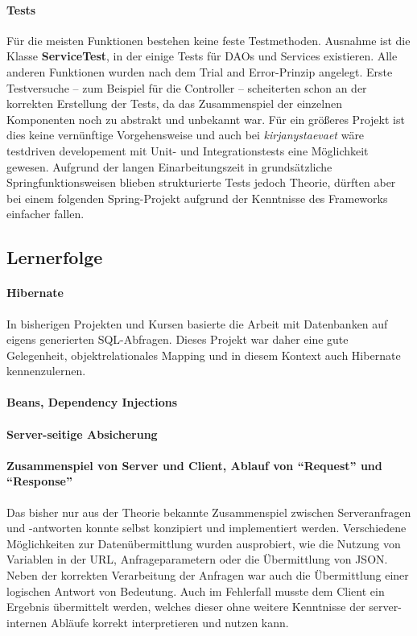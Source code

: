 		\paragraph{Tests} Für die meisten Funktionen bestehen keine feste Testmethoden. Ausnahme ist die Klasse \textbf{ServiceTest}, in der einige Tests für DAOs und Services existieren. Alle anderen Funktionen wurden nach dem Trial and Error-Prinzip angelegt. Erste Testversuche -- zum Beispiel für die Controller -- scheiterten schon an der korrekten Erstellung der Tests, da das Zusammenspiel der einzelnen Komponenten noch zu abstrakt und unbekannt war. Für ein größeres Projekt ist dies keine vernünftige Vorgehensweise und auch bei \textit{kirjanystaevaet} wäre testdriven developement mit Unit- und Integrationstests eine Möglichkeit gewesen. Aufgrund der langen Einarbeitungszeit in grundsätzliche Springfunktionsweisen blieben strukturierte Tests jedoch Theorie, dürften aber bei einem folgenden Spring-Projekt aufgrund der Kenntnisse des Frameworks einfacher fallen.

	\subsection{Lernerfolge}
		\paragraph{Hibernate} In bisherigen Projekten und Kursen basierte die Arbeit mit Datenbanken auf eigens generierten SQL-Abfragen. Dieses Projekt war daher eine gute Gelegenheit, objektrelationales Mapping und in diesem Kontext auch Hibernate kennenzulernen.
		
		\paragraph{Beans, Dependency Injections}
		
		\paragraph{Server-seitige Absicherung}
		
		\paragraph{Zusammenspiel von Server und Client, Ablauf von "`Request"' und "`Response"'}
		Das bisher nur aus der Theorie bekannte Zusammenspiel zwischen Serveranfragen und -antworten konnte selbst konzipiert und implementiert werden. Verschiedene Möglichkeiten zur Datenübermittlung wurden ausprobiert, wie die Nutzung von Variablen in der URL, Anfrageparametern oder die Übermittlung von JSON. Neben der korrekten Verarbeitung der Anfragen war auch die Übermittlung einer logischen Antwort von Bedeutung. Auch im Fehlerfall musste dem Client ein Ergebnis übermittelt werden, welches dieser ohne weitere Kenntnisse der server-internen Abläufe korrekt interpretieren und nutzen kann.
		
